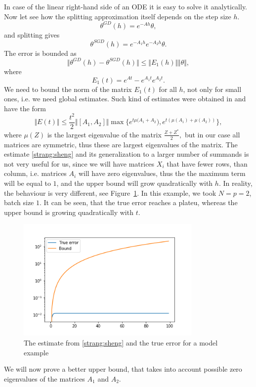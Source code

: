 \documentclass{article} %
\begin{document}
In case of the linear right-hand side of an ODE it is easy to solve it analytically. Now let see how the splitting approximation itself depends on the step size $h$.
$$\theta^{GD} (h) = e^{-Ah} \theta, $$
and splitting gives
$$\theta^{SGD}(h) = e^{-A_1 h} e^{-A_2 h} \theta.$$
The error is bounded as
$$
 \Vert \theta^{GD} (h) - \theta^{SGD}(h) \Vert \leq  \Vert E_1(h) \Vert \Vert \theta \Vert,
$$
where
\begin{equation}\label{strang:error}
E_1(t) = e^{A t} - e^{A_1 t} e^{A_2 t}.
\end{equation}
We need to bound the norm of the matrix $E_1(t)$ for all $h$, not only for small ones, i.e. we need global estimates. Such kind of estimates were obtained in \cite{sheng1994global} and have the form
\begin{equation}\label{strang:sheng}
    \Vert E(t) \Vert \leq \frac{t^2}{2} \Vert [ A_1, A_2] \Vert \max \{ e^{t \mu(A_1 + A_2}), e^{t(\mu(A_1) + \mu(A_2))}\},
\end{equation}
where $\mu(Z)$ is the largest eigenvalue of the matrix $\frac{Z+Z^*}{2},$ but in our case all matrices are symmetric, thus these are largest eigenvalues of the matrix. The estimate \eqref{strang:sheng} and its generalization to a larger number of summands is not very useful for us, since we will have matrices $X_i$ that have fewer rows, than column, i.e. matrices $A_i$ will have zero eigenvalues, thus the the maximum term will be equal to $1$, and the upper bound will grow quadratically with $h$. In reality, the behaviour is very different, see Figure~\ref{strang:modelfig}. In this example, we took $N=p=2$, batch size $1$. It can be seen, that the true error reaches a plateu, whereas the upper bound is growing quadratically with $t$.
\begin{figure}
\includegraphics[width=0.8\textwidth]{Errors.png}
\caption{The estimate from \eqref{strang:sheng} and the true error for a model example}\label{strang:modelfig}
\end{figure}
We will now prove a better upper bound, that takes into account  possible zero eigenvalues of the matrices $A_1$ and $A_2$.
\end{document}
